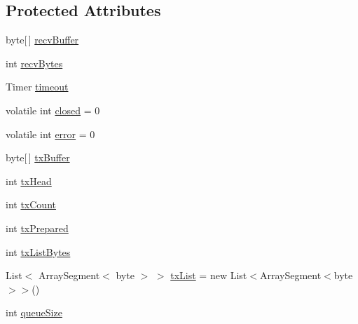\subsection*{Protected Attributes}
\begin{DoxyCompactItemize}
\item 
byte\mbox{[}$\,$\mbox{]} \hyperlink{class_o_t_a_1_1_sockets_1_1_connection_a1d8a2ef19b8f7545c3f48808ea47f129}{recv\+Buffer}
\item 
int \hyperlink{class_o_t_a_1_1_sockets_1_1_connection_ab7194fd3640d065f7f58629c816b8933}{recv\+Bytes}
\item 
Timer \hyperlink{class_o_t_a_1_1_sockets_1_1_connection_a77272930f5d4861753aa7b80948a7587}{timeout}
\item 
volatile int \hyperlink{class_o_t_a_1_1_sockets_1_1_connection_acd39fb30f5bb6ef8ea78584a320fc70b}{closed} = 0
\item 
volatile int \hyperlink{class_o_t_a_1_1_sockets_1_1_connection_a8bc7bc51def4a9f6ad9ff3854dbea338}{error} = 0
\item 
byte\mbox{[}$\,$\mbox{]} \hyperlink{class_o_t_a_1_1_sockets_1_1_connection_a119ffb5f067a2a64fe3e54c9202f1f67}{tx\+Buffer}
\item 
int \hyperlink{class_o_t_a_1_1_sockets_1_1_connection_a4fa34e1ea9b32dee651250875bcc57bf}{tx\+Head}
\item 
int \hyperlink{class_o_t_a_1_1_sockets_1_1_connection_a905722639521f33000b64b4e472bf9c6}{tx\+Count}
\item 
int \hyperlink{class_o_t_a_1_1_sockets_1_1_connection_a02b73236cfb9c37eb67eeeff2a23d09a}{tx\+Prepared}
\item 
int \hyperlink{class_o_t_a_1_1_sockets_1_1_connection_aa086b05edec99fcdbd485c8fdd2828ad}{tx\+List\+Bytes}
\item 
List$<$ Array\+Segment$<$ byte $>$ $>$ \hyperlink{class_o_t_a_1_1_sockets_1_1_connection_ac9aec243ec974c9fad47197cf922b90f}{tx\+List} = new List$<$Array\+Segment$<$byte$>$$>$()
\item 
int \hyperlink{class_o_t_a_1_1_sockets_1_1_connection_ac8d2b143d53419b8692eb2369f253c8d}{queue\+Size}
\end{DoxyCompactItemize}
